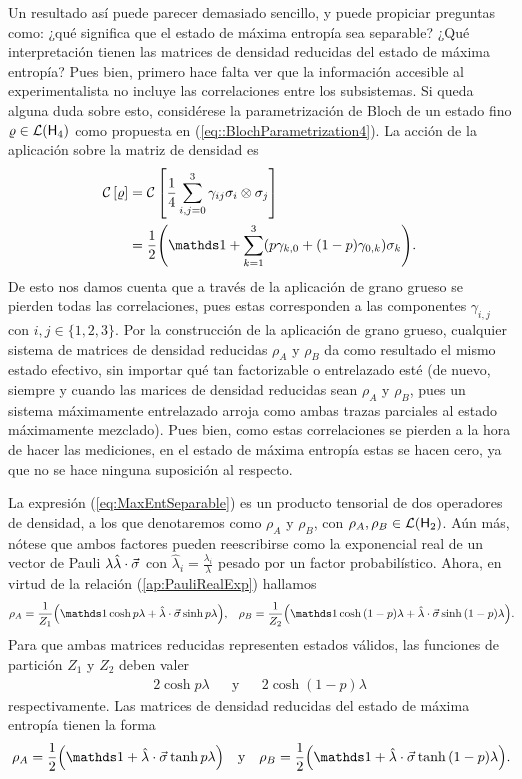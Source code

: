 Un resultado así puede parecer demasiado sencillo, y puede propiciar preguntas como: ¿qué significa que el estado de máxima entropía sea separable? ¿Qué interpretación tienen las matrices de densidad reducidas del estado de máxima entropía? Pues bien, primero hace falta ver que la información accesible al experimentalista no incluye las correlaciones entre los subsistemas. Si queda alguna duda sobre esto, considérese la parametrización de Bloch de un estado fino $\varrho\in\mathcal{L}({\sf H}_{4})$ como propuesta en (\ref{eq::BlochParametrization4}). La acción de la aplicación sobre la matriz de densidad es
\begin{align*}
    \CG{\varrho}&=\CG{\frac{1}{4}\sum_{i,j=0}^{3}\gamma_{ij}\pauli{i}\otimes \pauli{j}}\\
    &=\frac{1}{2}\qty(\Id+\sum_{k=1}^{3}(p\gamma_{k,0}+(1-p)\gamma_{0,k})\sigma_{k}).
\end{align*}
De esto nos damos cuenta que a través de la aplicación de grano grueso se pierden todas las correlaciones, pues estas corresponden a las componentes $\gamma_{i,j}$ con $i,j\in\{1,2,3\}$. Por la construcción de la aplicación de grano grueso, cualquier sistema de matrices de densidad reducidas $\rho_{A}$ y $\rho_{B}$ da como resultado el mismo estado efectivo, sin importar qué tan factorizable o entrelazado esté (de nuevo, siempre y cuando las marices de densidad reducidas sean $\rho_{A}$ y $\rho_{B}$, pues un sistema máximamente entrelazado arroja como ambas trazas parciales al estado máximamente mezclado). Pues bien, como estas correlaciones se pierden a la hora de hacer las mediciones, en el estado de máxima entropía estas se hacen cero, ya que no se hace ninguna suposición al respecto. 

La expresión (\ref{eq:MaxEntSeparable}) es un producto tensorial de dos operadores de densidad, a los que denotaremos como $\rho_{A}$ y $\rho_{B}$, con $\rho_{A}, \rho_{B}\in\mathcal{L}({\sf H}_{2})$. Aún más, nótese que ambos factores pueden reescribirse como la exponencial real de un vector de Pauli $\lambda\hat{\lambda}\cdot\vec{\sigma}$ con $\hat{\lambda}_{i}=\frac{\lambda_{i}}{\lambda}$ pesado por un factor probabilístico. Ahora, en virtud de la relación (\ref{ap:PauliRealExp}) hallamos
\begin{align*}
    \rho_{A}=\frac{1}{Z_{1}}\qty(\Id\cosh{p\lambda}+\paulivec{\lambda}\sinh{p\lambda}), && \rho_{B}=\frac{1}{Z_{2}}\qty(\Id\cosh{(1-p)\lambda}+\paulivec{\lambda}\sinh{(1-p)\lambda})\rlap{.}
\end{align*}
Para que ambas matrices reducidas representen estados válidos, las funciones de partición $Z_{1}$ y $Z_{2}$ deben valer
\begin{align*}
    2\cosh{p\lambda} && \text{y} && 2\cosh{(1-p)\lambda}
\end{align*}
respectivamente. Las matrices de densidad reducidas del estado de máxima entropía tienen la forma
\begin{align}\label{eq:rhoArhoB}
    \rho_{A}=\frac{1}{2}\qty(\Id+\paulivec{\lambda}\tanh{p\lambda}) && \text{y} && \rho_{B}=\frac{1}{2}\qty(\Id+\paulivec{\lambda}\tanh{(1-p)\lambda})\rlap{.}
\end{align}

